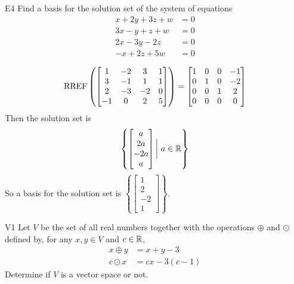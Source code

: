 \documentclass{sbgLAquiz}
\begin{document}
\begin{extract}\newpage\end{extract}
\begin{problem}{E4}
Find a basis for the solution set of the system of equations
\begin{align*}
x+2y+3z+w &= 0 \\
3x-y+z+w &= 0 \\
2x-3y-2z &= 0 \\
-x+2z+5w &=0
\end{align*}
\end{problem}
\begin{solution}
$$\operatorname{RREF} \left(\begin{bmatrix} 1 & -2 & 3 & 1 \\ 3 & -1 & 1 & 1 \\ 2 & -3 & -2 & 0 \\ -1 & 0 & 2 & 5 \end{bmatrix} \right) = \begin{bmatrix} 1 & 0 & 0 & -1 \\ 0 & 1 & 0 & -2 \\ 0 & 0 & 1 & 2 \\ 0 & 0 & 0 & 0\end{bmatrix}$$
Then the solution set is
$$\left\{ \begin{bmatrix} a \\ 2a \\ -2a \\ a \end{bmatrix} \bigg |\ a \in \mathbb{R} \right\}$$
So a basis for the solution set is $\left\{\begin{bmatrix} 1 \\ 2 \\ -2 \\ 1\end{bmatrix} \right\}$.
\end{solution}


\begin{problem}{V1}
Let $V$ be the  set of all real numbers together with the operations $\oplus$ and $\odot$ defined by, for any $x,y \in V$ and $c \in \mathbb{R}$,
\begin{align*}
x\oplus y  &= x+y-3 \\
c \odot x &= cx-3(c-1)
\end{align*}
Determine if $V$ is a vector space or not.
\end{problem}
\end{document}
